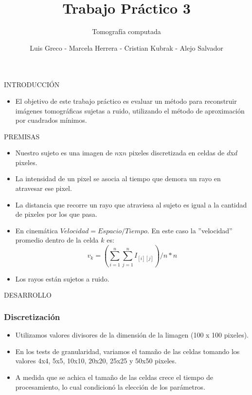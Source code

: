 \documentclass[11pt]{beamer}
\author{Luis Greco - Marcela Herrera - Cristian Kubrak - Alejo Salvador }
\title{Trabajo Práctico 3}
\subtitle{Tomografía computada}
\begin{document}
\begin{frame}
\titlepage 
\end{frame}


\begin{frame}{INTRODUCCIÓN}
\begin{itemize}
\item El objetivo de este trabajo práctico es evaluar un método para reconstruir imágenes tomográficas sujetas a ruido, utilizando el método de aproximación por cuadrados mínimos.
\end{itemize}
\end{frame}

\begin{frame}{PREMISAS}
\begin{itemize}
\item Nuestro sujeto es una imagen de $n$x$n$ pixeles discretizada en celdas de $d$x$d$ pixeles.
\item La intensidad de un pixel se asocia al tiempo que demora un rayo en atravesar ese pixel.
\item La distancia que recorre un rayo que atraviesa al sujeto es igual a la cantidad de pixeles por los que pasa.
\item En cinemática $Velocidad = Espacio/Tiempo$. En este caso la ''velocidad'' promedio dentro de la celda $k$ es:
\begin{displaymath}
v_{k} =(\sum_{i=1}^{n}\sum_{j=1}^{n} I_{[i][j]})/n*n
\end{displaymath}
\item Los rayos están sujetos a ruido.
\end{itemize}
\end{frame}


\begin{frame}{DESARROLLO}
\frametitle {Discretización}
\begin{itemize}
\item Utilizamos valores divisores de la dimensión de la limagen (100 x 100 pixeles).
\item En los tests de granularidad, variamos el tamaño de las celdas tomando los valores 4x4, 5x5, 10x10, 20x20, 25x25 y 50x50 pixeles.
\item A medida que se achica el tamaño de las celdas crece el tiempo de procesamiento, lo cual condicionó la elección de los parámetros.
\end{itemize}
\end{frame}
\end{document}
